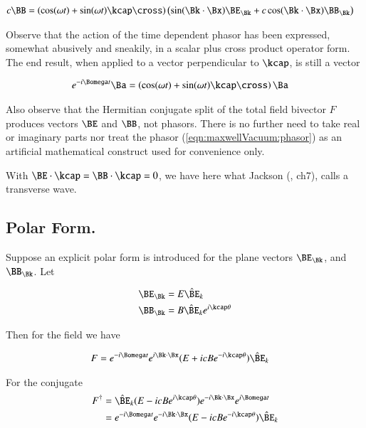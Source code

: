 \begin{align}\label{eqn:maxwellVacuum:magneticSplit}
c \BB &=
\left( \cos(\omega t) + \sin(\omega t) \kcap \cross \right)
\left(
 \sin(\Bk \cdot \Bx) \BE_\Bk
+ c \cos(\Bk \cdot \Bx) \BB_\Bk
\right)
\end{align}

Observe that the action of the time dependent phasor has been expressed, somewhat abusively and sneakily, in a scalar plus cross product operator form.  The end result, when applied to a vector perpendicular to $\kcap$, is still a vector

\begin{align*}
e^{-i\Bomega t} \Ba
&=
\left( \cos(\omega t) + \sin(\omega t) \kcap \cross \right) \Ba
\end{align*}

Also observe that the Hermitian conjugate split of the total field bivector $F$ produces vectors $\BE$ and $\BB$, not phasors.  There is no further need to take real or imaginary parts nor treat the phasor (\ref{eqn:maxwellVacuum:phasor}) as an artificial mathematical construct used for convenience only.

With $\BE \cdot \kcap = \BB \cdot \kcap = 0$, we have here what Jackson (\cite{jackson1975cew}, ch7), calls a transverse wave.

\subsection{Polar Form.}

Suppose an explicit polar form is introduced for the plane vectors $\BE_\Bk$, and $\BB_\Bk$.  Let

\begin{align*}
\BE_\Bk &= E {\hat{\BE}_k} \\
\BB_\Bk &= B {\hat{\BE}_k} e^{i\kcap \theta}
\end{align*}

Then for the field we have

\begin{align}\label{eqn:maxwellVacuum:phasorPolar}
F &= e^{-i\Bomega t} e^{i \Bk \cdot \Bx} (E + i c B e^{-i\kcap \theta}) \hat{\BE}_k
\end{align}

For the conjugate
\begin{align*}
F^\dagger
&=
\hat{\BE}_k
(E - i c B e^{i\kcap \theta})
e^{-i \Bk \cdot \Bx}
e^{i\Bomega t} \\
&=
e^{-i\Bomega t} e^{-i \Bk \cdot \Bx} (E - i c B e^{-i\kcap \theta}) \hat{\BE}_k
\end{align*}

